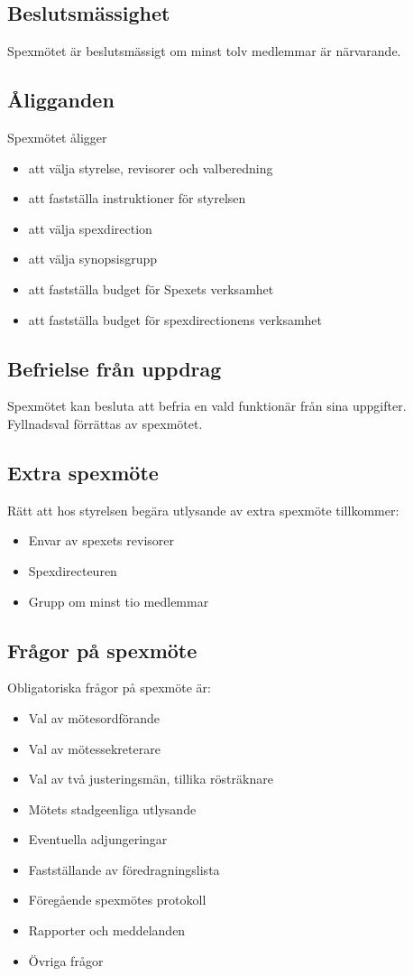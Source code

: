 \documentclass[a4paper]{article}
\begin{document}
\subsection{Beslutsmässighet}
Spexmötet är beslutsmässigt om minst tolv medlemmar är närvarande.

\subsection{Åligganden}
Spexmötet åligger

\begin{itemize}
  \item att välja styrelse, revisorer och valberedning
  \item att fastställa instruktioner för styrelsen
  \item att välja spexdirection
  \item att välja synopsisgrupp
  \item att fastställa budget för Spexets verksamhet
  \item att fastställa budget för spexdirectionens verksamhet
\end{itemize}

\subsection{Befrielse från uppdrag}
Spexmötet kan besluta att befria en vald funktionär från sina uppgifter. Fyllnadsval förrättas av spexmötet.

\subsection{Extra spexmöte}
Rätt att hos styrelsen begära utlysande av extra spexmöte tillkommer:

\begin{itemize}
  \item Envar av spexets revisorer
  \item Spexdirecteuren
  \item Grupp om minst tio medlemmar
\end{itemize}

\subsection{Frågor på spexmöte}
Obligatoriska frågor på spexmöte är:

\begin{itemize}
  \item Val av mötesordförande
  \item Val av mötessekreterare
  \item Val av två justeringsmän, tillika rösträknare
  \item Mötets stadgeenliga utlysande
  \item Eventuella adjungeringar
  \item Fastställande av föredragningslista
  \item Föregående spexmötes protokoll
  \item Rapporter och meddelanden
  \item Övriga frågor
\end{itemize}
\end{document}
